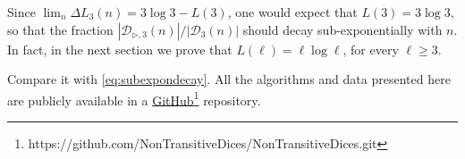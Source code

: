 \documentclass[reqno,a4paper,11pt]{amsart}
\newcommand{\btt}{\triangleright}
\theoremstyle{remark}
\newcommand{\mc}[1]{{\mathcal #1}}
\numberwithin{equation}{section}
\begin{document}
    Since $\lim_n \Delta L_3 (n)=3\log 3-L(3)$, one would expect that $L(3)=3\log 3$, so that the fraction $|\mc D_{\btt, 3}(n)|/|\mc D_3(n)|$ should decay sub-exponentially with $n$. In fact, in the next section we prove that $L(\ell)=\ell\log\ell$, for every $\ell\ge3$.

Compare it with \eqref{eq:subexpondecay}. All the algorithms and data presented here are publicly available in a \href{https://github.com/NonTransitiveDices/NonTransitiveDices.git}{GitHub}\footnote{https://github.com/NonTransitiveDices/NonTransitiveDices.git} repository.

\end{document}
